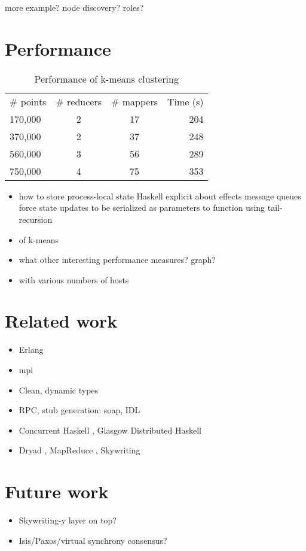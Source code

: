 \documentclass[preprint]{sigplanconf}
\begin{document}
more example? node discovery? roles?

\section{Performance}
\begin{center}
\begin{table}[h]
 \caption{Performance of k-means clustering}
\begin{tabular}{l c c|r}
\hline
  \# points & \# reducers & \# mappers & Time (s) \\
  170,000 & 2 & 17 & 204 \\
  370,000 & 2 & 37 & 248 \\
  560,000 & 3 & 56 & 289 \\
  750,000 & 4 & 75 & 353 \\
\hline
\end{tabular}
\end{table}
\end{center}
\begin{itemize}
\item how to store process-local state
Haskell explicit about effects
message queues force state updates to be serialized as parameters to function using tail-recursion 

\item of k-means
\item what other interesting performance measures? graph?
\item with various numbers of hosts
\end{itemize}

\section{Related work}
\begin{itemize}
\item Erlang 
\item mpi 
\item Clean, dynamic types
\item RPC, stub generation: soap, IDL
\item Concurrent Haskell \cite{Parallel2008}, Glasgow Distributed Haskell \cite{gdh2001}
\item Dryad \cite{Dryad2007}, MapReduce \cite{MapReduce2008}, Skywriting \cite{Murray2010}
\end{itemize}

\section{Future work}
\begin{itemize}
\item Skywriting-y layer on top?
\item Isis/Paxos/virtual synchrony consensus?
\end{itemize}
\end{document}
